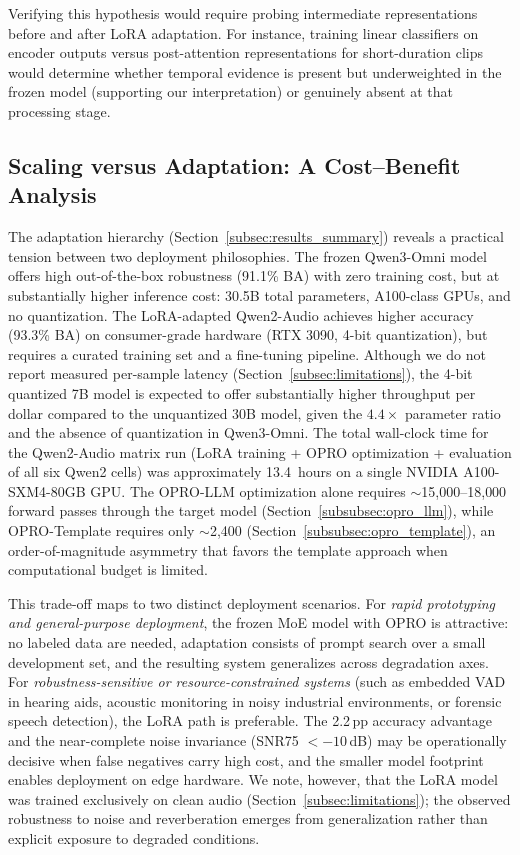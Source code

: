\documentclass[11pt,a4paper]{article}
\begin{document}
Verifying this hypothesis would require probing intermediate representations before and
after LoRA adaptation. For instance, training linear classifiers on encoder outputs versus
post-attention representations for short-duration clips would determine whether temporal
evidence is present but underweighted in the frozen model (supporting our interpretation)
or genuinely absent at that processing stage.

\subsection{Scaling versus Adaptation: A Cost--Benefit Analysis}
\label{subsec:disc_cost_benefit}

The adaptation hierarchy (Section~\ref{subsec:results_summary}) reveals a practical tension between two deployment philosophies. The frozen Qwen3-Omni model offers high out-of-the-box robustness (91.1\% BA) with zero training cost, but at substantially higher inference cost: 30.5B total parameters, A100-class GPUs, and no quantization. The LoRA-adapted Qwen2-Audio achieves higher accuracy (93.3\% BA) on consumer-grade hardware (RTX 3090, 4-bit quantization), but requires a curated training set and a fine-tuning pipeline. Although we do not report measured per-sample latency (Section~\ref{subsec:limitations}), the 4-bit quantized 7B model is expected to offer substantially higher throughput per dollar compared to the unquantized 30B model, given the $4.4\times$ parameter ratio and the absence of quantization in Qwen3-Omni. The total wall-clock time for the Qwen2-Audio matrix run (LoRA training + OPRO optimization + evaluation of all six Qwen2 cells) was approximately 13.4~hours on a single NVIDIA A100-SXM4-80GB GPU. The OPRO-LLM optimization alone requires ${\sim}$15{,}000--18{,}000 forward passes through the target model (Section~\ref{subsubsec:opro_llm}), while OPRO-Template requires only ${\sim}$2{,}400 (Section~\ref{subsubsec:opro_template}), an order-of-magnitude asymmetry that favors the template approach when computational budget is limited.

This trade-off maps to two distinct deployment scenarios. For \emph{rapid prototyping and general-purpose deployment}, the frozen MoE model with OPRO is attractive: no labeled data are needed, adaptation consists of prompt search over a small development set, and the resulting system generalizes across degradation axes. For \emph{robustness-sensitive or resource-constrained systems} (such as embedded VAD in hearing aids, acoustic monitoring in noisy industrial environments, or forensic speech detection), the LoRA path is preferable. The 2.2\,pp accuracy advantage and the near-complete noise invariance (SNR75 $< -10$\,dB) may be operationally decisive when false negatives carry high cost, and the smaller model footprint enables deployment on edge hardware. We note, however, that the LoRA model was trained exclusively on clean audio (Section~\ref{subsec:limitations}); the observed robustness to noise and reverberation emerges from generalization rather than explicit exposure to degraded conditions.
\end{document}
